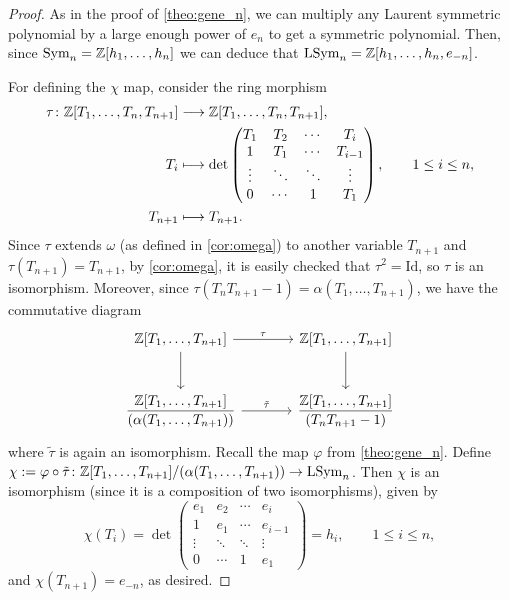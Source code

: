 \documentclass[11pt]{amsart}
\begin{document}
\begin{proof}
As in the proof of \cref{theo:gene_n}, we can multiply any Laurent symmetric polynomial by a large enough power of \(e_n\) to get a symmetric polynomial. Then, since \(\mathrm{Sym}_n = \mathbb{Z}[h_1,\dots,h_n]\) we can deduce that \(\mathrm{LSym}_n = \mathbb{Z} [h_1,\dots,h_n,e_{-n}]\).

For defining the \(\chi\) map, consider the ring morphism
\begin{align*}
    \tau \colon \mathbb{Z}[T_1,\dots,T_n, T_{n + 1}] &\longrightarrow \mathbb{Z}[T_1,\dots,T_n,T_{n + 1}],\\
    T_i &\longmapsto \det      \begin{pmatrix}
        T_1 & T_2 & \cdots & T_i\\
        1 & T_1 & \cdots  & T_{i -1}\\
        \vdots & \ddots & \ddots & \vdots\\
        0 & \cdots & 1 & T_1
    \end{pmatrix}, \qquad 1 \leq i \leq n, \\
    T_{n + 1} &\longmapsto T_{n + 1}.
\end{align*}
Since $\tau$ extends \(\omega\) (as defined in \cref{cor:omega}) to another variable \(T_{n + 1}\) and \(\tau (T_{n + 1}) = T_{n + 1}\), by \cref{cor:omega}, it is easily checked that \(\tau^2 = \mathrm{Id}\), so $\tau$ is an isomorphism. Moreover, since \(\tau (T_n T_{n + 1} - 1) = \alpha (T_1,\dots,T_{n + 1}) \), we have the commutative diagram
\[
\begin{tikzcd}[row sep=large, column sep=large]
\mathbb{Z}[T_1, \dots, T_{n+1}] \arrow[r, "\tau"] \arrow[d] & \mathbb{Z}[T_1, \dots, T_{n+1}] \arrow[d] \\
\dfrac{\mathbb{Z}[T_1, \dots, T_{n+1}]}{(\alpha(T_1, \dots, T_{n+1}))} \arrow[r, "\tilde{\tau}"] & \dfrac{\mathbb{Z}[T_1, \dots, T_{n+1}]}{(T_n T_{n+1} - 1)}
\end{tikzcd}
\]
where \(\tilde{\tau}\) is again an isomorphism. Recall the map \(\varphi \) from \cref{theo:gene_n}. Define \(\chi : = \varphi \circ \tilde{\tau} \colon \mathbb{Z}[T_1,\dots,T_{n + 1}]/(\alpha(T_1,\dots,T_{n + 1})) \rightarrow \mathrm{LSym}_n\). Then \(\chi\) is an isomorphism (since it is a composition of two isomorphisms), given by 
\[
\chi (T_i) = \det\begin{pmatrix}
        e_1 & e_2 & \cdots & e_i\\
        1 & e_1 & \cdots  & e_{i -1}\\
        \vdots & \ddots & \ddots & \vdots\\
        0 & \cdots & 1 & e_1
        \end{pmatrix} = h_i, \qquad 1 \leq i \leq n,
\]
and \(\chi(T_{n + 1}) = e_{-n}\), as desired.
\end{proof}
\end{document}
